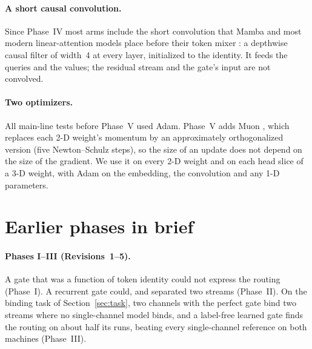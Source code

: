 \documentclass[11pt]{article}
\begin{document}
\paragraph{A short causal convolution.} Since Phase~IV most arms include the short convolution that Mamba and most modern linear-attention models place before their token mixer \cite{mamba}: a depthwise causal filter of width~4 at every layer, initialized to the identity. It feeds the queries and the values; the residual stream and the gate's input are not convolved.

\paragraph{Two optimizers.} All main-line tests before Phase~V used Adam. Phase~V adds Muon \cite{muon, muonscale}, which replaces each 2-D weight's momentum by an approximately orthogonalized version (five Newton--Schulz steps), so the size of an update does not depend on the size of the gradient. We use it on every 2-D weight and on each head slice of a 3-D weight, with Adam on the embedding, the convolution and any 1-D parameters.

\section{Earlier phases in brief}
\label{sec:prior}

\paragraph{Phases I--III (Revisions~1--5).} A gate that was a function of token identity could not express the routing (Phase~I). A recurrent gate could, and separated two streams (Phase~II). On the binding task of Section~\ref{sec:task}, two channels with the perfect gate bind two streams where no single-channel model binds, and a label-free learned gate finds the routing on about half its runs, beating every single-channel reference on both machines (Phase~III).
\end{document}
